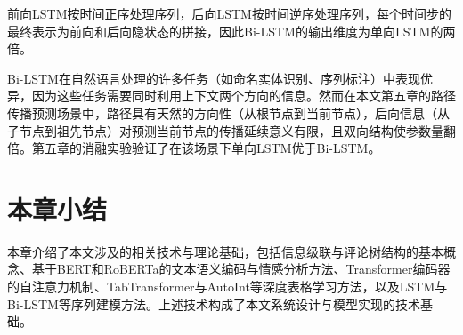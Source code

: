 前向LSTM按时间正序处理序列，后向LSTM按时间逆序处理序列，每个时间步的最终表示为前向和后向隐状态的拼接，因此Bi-LSTM的输出维度为单向LSTM的两倍。

Bi-LSTM在自然语言处理的许多任务（如命名实体识别\cite{lample2016neural}、序列标注\cite{huang2015bidirectional}）中表现优异，因为这些任务需要同时利用上下文两个方向的信息。然而在本文第五章的路径传播预测场景中，路径具有天然的方向性（从根节点到当前节点），后向信息（从子节点到祖先节点）对预测当前节点的传播延续意义有限，且双向结构使参数量翻倍。第五章的消融实验验证了在该场景下单向LSTM优于Bi-LSTM。

\section{本章小结}

本章介绍了本文涉及的相关技术与理论基础，包括信息级联与评论树结构的基本概念、基于BERT和RoBERTa的文本语义编码与情感分析方法、Transformer编码器的自注意力机制、TabTransformer与AutoInt等深度表格学习方法，以及LSTM与Bi-LSTM等序列建模方法。上述技术构成了本文系统设计与模型实现的技术基础。